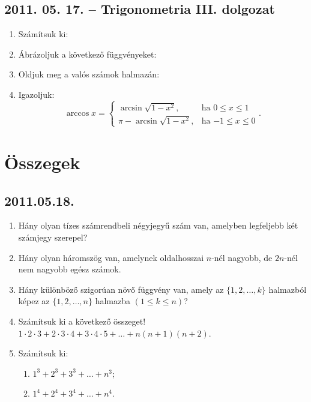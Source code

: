 \subsection*{2011. 05. 17. -- Trigonometria III. dolgozat}
\begin{enumerate}
\item Számítsuk ki:
\item Ábrázoljuk a következő függvényeket:
\item Oldjuk meg a valós számok halmazán:
\item Igazoljuk:
\[\arccos x=\begin{cases}
\arcsin\sqrt{1-x^2},&\text{ha $0\le x\le1$}\\
\pi-\arcsin\sqrt{1-x^2},&\text{ha $-1\le x\le0$}
\end{cases}.\]
\end{enumerate}

\section{Összegek}

\subsection*{2011.05.18.}
\begin{enumerate}
\item Hány olyan tízes számrendbeli négyjegyű szám van, amelyben legfeljebb két számjegy szerepel?
\item Hány olyan háromszög van, amelynek oldalhosszai $n$-nél nagyobb, de $2n$-nél nem nagyobb egész számok.
\item Hány különböző szigorúan növő függvény van, amely az $\{ 1, 2, \ldots, k\}$ halmazból képez az $\{ 1, 2, \ldots, n\}$ halmazba $(1\le k\le n)$?
\item Számítsuk ki a következő összeget! $1\cdot2\cdot3+2\cdot3\cdot4+3\cdot4\cdot5+\ldots +n(n+1)(n+2)$.
\item Számítsuk ki:
\begin{enumerate}
\item $1^3+2^3+3^3+\ldots+n^3$;
\item $1^4+2^4+3^4+\ldots+n^4$.
\end{enumerate}
\end{enumerate}

